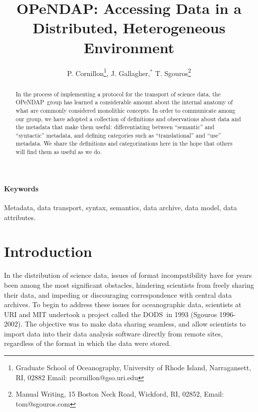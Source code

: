 \documentclass{codata}
\newcommand{\opendap}{\ac{OPeNDAP}}
\newcommand{\dods}{\ac{DODS}}
\begin{document}
\title{\acs{OPeNDAP}: Accessing Data in a Distributed, Heterogeneous
  Environment}
\author{P. Cornillon\footnote{Graduate School of Oceanography,
  University of Rhode Island, Narragansett, 
    RI, 02882 Email: pcornillon@gso.uri.edu}, J. Gallagher,$^*$
  T. Sgouros\footnote{Manual Writing, 15 Boston Neck Road, Wickford,
  RI, 02852, Email: tom@sgouros.com}\\}

\maketitle
\begin{abstract}
  In the process of implementing a protocol for the transport of
  science data, the \opendap\ group has learned a considerable amount
  about the internal anatomy of what are commonly considered
  monolithic concepts.  In order to communicate among our group, we
  have adopted a collection of definitions and observations about data
  and the metadata that make them useful: differentiating between
  ``semantic'' and ``syntactic'' metadata, and defining categories
  such as ``translational'' and ``use'' metadata.  We share the
  definitions and categorizations here in the hope that others will
  find them as useful as we do.
\end{abstract}

\paragraph{Keywords} Metadata, data transport, syntax, semantics, data archive,
data model, data attributes.

\section{Introduction}

In the distribution of science data, issues of format incompatibility
have for years been among the most significant obstacles, hindering
scientists from freely sharing their data, and impeding or
discouraging correspondence with central data archives.  To begin to
address these issues for oceanographic data, scientists at URI and MIT
undertook a project called the \dods\ in 1993 (Sgouros 1996-2002). The 
objective was to make data sharing seamless, and allow scientists to 
import data into their data analysis software directly from remote 
sites, regardless of the format in which the data were stored.
\end{document}
